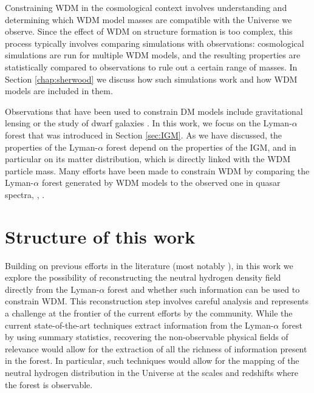 Constraining WDM in the cosmological context involves understanding and determining which WDM model masses are compatible with the Universe we observe. Since the effect of WDM on structure formation is too complex, this process typically involves comparing simulations with observations: cosmological simulations are run for multiple WDM models, and the resulting properties are statistically compared to observations to rule out a certain range of masses. In Section \ref{chap:sherwood} we discuss how such simulations work and how WDM models are included in them.

Observations that have been used to constrain DM models include gravitational lensing \cite{Massey_2010} or the study of dwarf galaxies \cite{Calore_2018}. In this work, we focus on the Lyman-$\alpha$ forest that was introduced in Section \ref{sec:IGM}. As we have discussed, the properties of the Lyman-$\alpha$ forest depend on the properties of the IGM, and in particular on its matter distribution, which is directly linked with the WDM particle mass. Many efforts have been made to constrain WDM by comparing the Lyman-$\alpha$ forest generated by WDM models to the observed one in quasar spectra\cite{sherwood_wdm}, \cite{Villasenor_2023}, \cite{Viel_2005}.

\section{Structure of this work}
Building on previous efforts in the literature (most notably \cite{nasir2024deep}), in this work we explore the possibility of reconstructing the neutral hydrogen density field directly from the Lyman-$\alpha$ forest and whether such information can be used to constrain WDM. This reconstruction step involves careful analysis and represents a challenge at the frontier of the current efforts by the community. While the current state-of-the-art techniques extract information from the Lyman-$\alpha$ forest by using summary statistics, recovering the
non-observable physical fields of relevance would allow for the extraction of all the richness of information present in the forest. In particular, such techniques would allow for the mapping of the neutral hydrogen distribution in the Universe at the scales and redshifts where the forest is observable.


